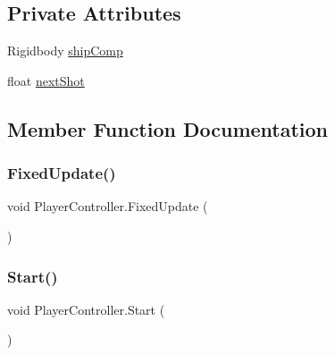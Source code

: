 \subsection*{Private Attributes}
\begin{DoxyCompactItemize}
\item 
Rigidbody \mbox{\hyperlink{class_player_controller_a5d64e56b8041db544f0629bb7691c166}{ship\+Comp}}
\item 
float \mbox{\hyperlink{class_player_controller_a5e54de3b97dbeaedd68f263ae91faa1f}{next\+Shot}}
\end{DoxyCompactItemize}


\subsection{Member Function Documentation}
\mbox{\label{class_player_controller_ae5bdb1b48571f67c3f722a58b6f404d4}} 
\subsubsection{\texorpdfstring{Fixed\+Update()}{FixedUpdate()}}
{\footnotesize\ttfamily void Player\+Controller.\+Fixed\+Update (\begin{DoxyParamCaption}{ }\end{DoxyParamCaption})\hspace{0.3cm}{\ttfamily [private]}}

\mbox{\label{class_player_controller_ae1117d9c4da3193181cddad2c814e467}} 
\subsubsection{\texorpdfstring{Start()}{Start()}}
{\footnotesize\ttfamily void Player\+Controller.\+Start (\begin{DoxyParamCaption}{ }\end{DoxyParamCaption})\hspace{0.3cm}{\ttfamily [private]}}

\mbox{\label{class_player_controller_ae8bc83dffb99867a04be016473ed2c43}} 
